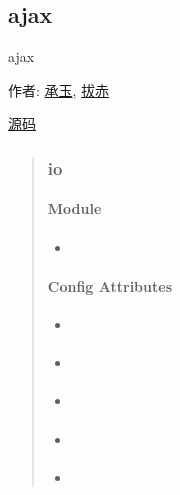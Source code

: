\documentclass[letterpaper,10pt,english]{sphinxmanual}
\begin{document}
\subsection{ajax}
\label{api/core/ajax/index:ajax}\label{api/core/ajax/index::doc}
\begin{DUlineblock}{0em}
\item[] ajax
\item[] 作者: \href{mailto:yiminghe@gmail.com}{承玉}, \href{mailto:lijing00333@163.com}{拔赤}
\item[] \href{https://github.com/kissyteam/kissy/tree/master/src/ajax}{源码}
\end{DUlineblock}
\begin{quote}


\subsubsection{io}
\label{api/core/ajax/io::doc}\label{api/core/ajax/io:io}

\paragraph{Module}
\label{api/core/ajax/io:module}\begin{itemize}
\item {}
{\hyperref[api/core/ajax/index:module-io]{}}

\end{itemize}


\paragraph{Config Attributes}
\label{api/core/ajax/io:config-attributes}\begin{itemize}
\item {}
{\hyperref[api/core/ajax/io:io.cfg.url]{}}

\item {}
{\hyperref[api/core/ajax/io:io.cfg.accepts]{}}

\item {}
{\hyperref[api/core/ajax/io:io.cfg.dataType]{}}

\item {}
{\hyperref[api/core/ajax/io:io.cfg.processData]{}}

\item {}
{\hyperref[api/core/ajax/io:io.cfg.async]{}}


\end{itemize}
\end{quote}
\end{document}
